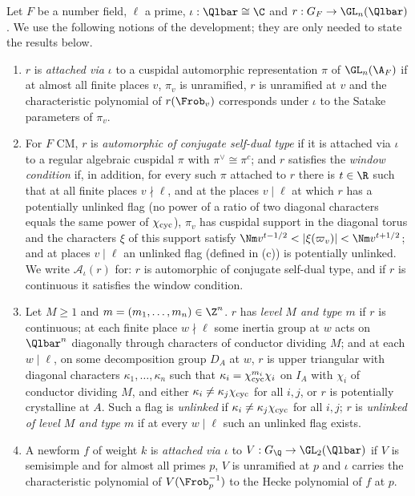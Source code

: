 \begin{definition}\label{pf:eis:autlevel}
Let $F$ be a number field, $\ell$ a prime, $\iota:\Qlbar\cong\C$ and $r:G_F\to\GL_n(\Qlbar)$. We use the following
notions of the development; they are only needed to state the results below.
\begin{enumerate}[label=(\alph*)]
\item $r$ is \emph{attached via $\iota$} to a cuspidal automorphic representation $\pi$ of $\GL_n(\A_F)$ if at
  almost all finite places $v$, $\pi_v$ is unramified, $r$ is unramified at $v$ and the characteristic polynomial
  of $r(\Frob_v)$ corresponds under $\iota$ to the Satake parameters of $\pi_v$.
\item For $F$ CM, $r$ is \emph{automorphic of conjugate self-dual type} if it is attached via $\iota$ to a regular
  algebraic cuspidal $\pi$ with $\pi^\vee\cong\pi^c$; and $r$ satisfies the \emph{window condition} if, in addition,
  for every such $\pi$ attached to $r$ there is $t\in\R$ such that at all finite places $v\nmid\ell$, and at the places
  $v\mid\ell$ at which $r$ has a potentially unlinked flag (no power of a ratio of two diagonal characters equals the
  same power of $\chi_{\mathrm{cyc}}$), $\pi_v$ has cuspidal support in the diagonal torus and the characters $\xi$ of this
  support satisfy $\Nm v^{t-1/2}<|\xi(\varpi_v)|<\Nm v^{t+1/2}$; and at places $v\mid\ell$ an unlinked flag
  (defined in (c)) is potentially unlinked. We write
  $\mathcal A_\iota(r)$ for: $r$ is automorphic of conjugate self-dual type, and if $r$ is continuous it satisfies
  the window condition.
\item Let $M\ge1$ and $m=(m_1,\dots,m_n)\in\Z^n$. $r$ has \emph{level $M$ and type $m$} if $r$ is continuous; at each
  finite place $w\nmid\ell$ some inertia group at $w$ acts on $\Qlbar^n$ diagonally through characters of conductor
  dividing $M$; and at each $w\mid\ell$, on some decomposition group $D_A$ at $w$, $r$ is upper triangular with
  diagonal characters $\kappa_1,\dots,\kappa_n$ such that $\kappa_i=\chi_{\mathrm{cyc}}^{m_i}\chi_i$ on $I_A$ with $\chi_i$ of
  conductor dividing $M$, and either $\kappa_i\ne\kappa_j\chi_{\mathrm{cyc}}$ for all $i,j$, or $r$ is potentially crystalline at
  $A$. Such a flag is \emph{unlinked} if $\kappa_i\ne\kappa_j\chi_{\mathrm{cyc}}$ for all $i,j$; $r$ is \emph{unlinked of level $M$ and
  type $m$} if at every $w\mid\ell$ such an unlinked flag exists.
\item A newform $f$ of weight $k$ is \emph{attached via $\iota$} to $V:G_\Q\to\GL_2(\Qlbar)$ if $V$ is semisimple and
  for almost all primes $p$, $V$ is unramified at $p$ and $\iota$ carries the characteristic polynomial of
  $V(\Frob_p^{-1})$ to the Hecke polynomial of $f$ at $p$.
\end{enumerate}
\end{definition}

